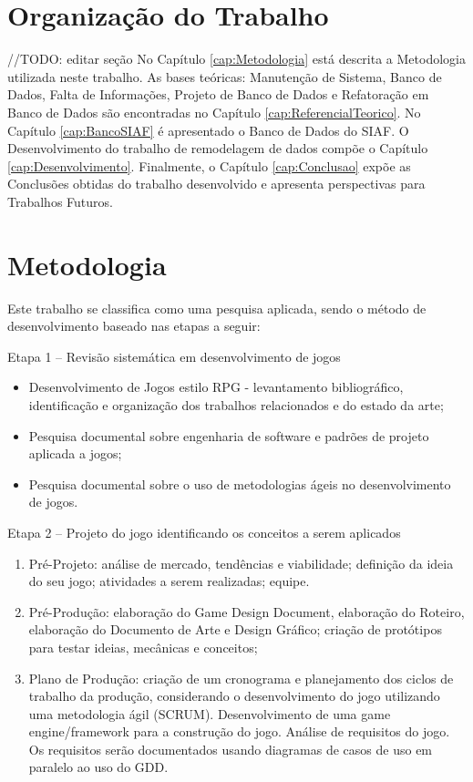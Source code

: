 \documentclass[12pt, 
openright, 
oneside, 
a4paper,    
brazil]{facom-ufu-abntex2}
\begin{document}
\section{Organização do Trabalho}
//TODO: editar seção
No Capítulo \ref{cap:Metodologia} está descrita a Metodologia utilizada neste trabalho. As bases teóricas: Manutenção de Sistema, Banco de Dados, Falta de Informações, Projeto de Banco de Dados e Refatoração em Banco de Dados são encontradas no Capítulo \ref{cap:ReferencialTeorico}. No Capítulo \ref{cap:BancoSIAF} é apresentado o Banco de Dados do SIAF. O Desenvolvimento do trabalho de remodelagem de dados compõe o Capítulo \ref{cap:Desenvolvimento}. Finalmente, o Capítulo \ref{cap:Conclusao} expõe as Conclusões obtidas do trabalho desenvolvido e apresenta perspectivas para Trabalhos Futuros.


\iffalse
\section{Metodologia}


Este trabalho se classifica como uma pesquisa aplicada, sendo o método de desenvolvimento baseado nas etapas a seguir:

Etapa 1 – Revisão sistemática em desenvolvimento de jogos
\begin{itemize}
\item Desenvolvimento de Jogos estilo RPG - levantamento bibliográfico, identificação e organização dos trabalhos relacionados e do estado da arte;
\item Pesquisa documental sobre engenharia de software e padrões de projeto aplicada a jogos;
\item Pesquisa documental sobre o uso de metodologias ágeis no desenvolvimento de jogos.
\end{itemize}

Etapa 2 – Projeto do jogo identificando os conceitos a serem aplicados 
\begin{enumerate}
\item Pré-Projeto: análise de mercado, tendências e viabilidade;
definição da ideia do seu jogo; atividades a serem realizadas;
equipe.
\item Pré-Produção: elaboração do Game Design Document, elaboração do Roteiro, elaboração do Documento de Arte e Design Gráfico; criação de protótipos para testar ideias, mecânicas e conceitos;
\item Plano de Produção: criação de um cronograma e planejamento dos ciclos de trabalho da produção, considerando o desenvolvimento do jogo utilizando uma  metodologia ágil (SCRUM). Desenvolvimento de uma game engine/framework para a construção do jogo. Análise de requisitos do jogo. Os requisitos serão documentados usando diagramas de casos de uso em paralelo ao uso do GDD.
\end{enumerate}
\end{document}
